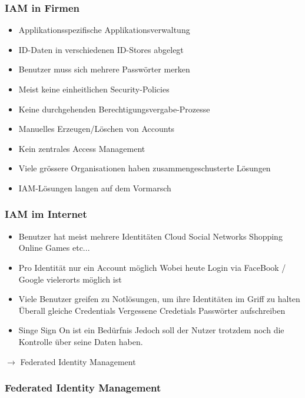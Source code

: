 \documentclass[a4paper, 11pt]{article}
\begin{document}
\subsubsection{IAM in Firmen}
\begin{itemize}
	\item Applikationsspezifische Applikationsverwaltung
	\item ID-Daten in verschiedenen ID-Stores abgelegt
	\item Benutzer muss sich mehrere Passwörter merken
	\item Meist keine einheitlichen Security-Policies
	\item Keine durchgehenden Berechtigungsvergabe-Prozesse
	\item Manuelles Erzeugen/Löschen von Accounts
	\item Kein zentrales Access Management
	\item Viele grössere Organisationen haben zusammengeschusterte Lösungen
	\item IAM-Lösungen langen auf dem Vormarsch
\end{itemize}

\subsubsection{IAM im Internet}
\begin{itemize}
	\item Benutzer hat meist mehrere Identitäten
		\subitem Cloud
		\subitem Social Networks
		\subitem Shopping
		\subitem Online Games
		\subitem etc...
	\item Pro Identität nur ein Account möglich
		\subitem Wobei heute Login via FaceBook / Google vielerorts möglich ist
	\item Viele Benutzer greifen zu Notlösungen, um ihre Identitäten im Griff zu halten
		\subitem Überall gleiche Credentials
		\subitem Vergessene Credetials
		\subitem Passwörter aufschreiben
	\item Singe Sign On ist ein Bedürfnis
		\subitem Jedoch soll der Nutzer trotzdem noch die Kontrolle über seine Daten haben.
\end{itemize}

$\rightarrow$ Federated Identity Management

\subsubsection{Federated Identity Management}
\end{document}
